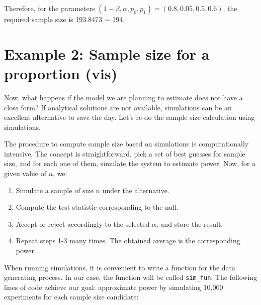 \documentclass[
]{book}
\begin{document}
Therefore, for the parameters \((1-\beta, \alpha, p_0, p_1) = (0.8, 0.05, 0.5, 0.6)\), the required sample size is 193.8473 \(\sim\) 194.

\hypertarget{example-2-sample-size-for-a-proportion-vis}{%
\section{Example 2: Sample size for a proportion (vis)}\label{example-2-sample-size-for-a-proportion-vis}}

Now, what happens if the model we are planning to estimate does not have a close form? If analytical solutions are not available, simulations can be an excellent alternative to save the day. Let's re-do the sample size calculation using simulations.

The procedure to compute sample size based on simulations is computationally intensive. The concept is straightforward, pick a set of best guesses for sample size, and for each one of them, simulate the system to estimate power. Now, for a given value of \(n\), we:

\begin{enumerate}
\def\labelenumi{\arabic{enumi}.}
\item
  Simulate a sample of size \(n\) under the alternative.
\item
  Compute the test statistic corresponding to the null.
\item
  Accept or reject accordingly to the selected \(\alpha\), and store the result.
\item
  Repeat steps 1-3 many times. The obtained average is the corresponding power.
\end{enumerate}

When running simulations, it is convenient to write a function for the data generating process. In our case, the function will be called \texttt{sim\_fun}. The following lines of code achieve our goal: approximate power by simulating 10,000 experiments for each sample size candidate:
\end{document}
